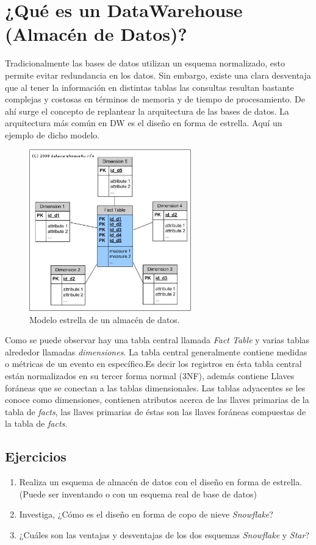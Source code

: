 \section{¿Qué es un DataWarehouse (Almacén de Datos)?}
Tradicionalmente las bases de datos utilizan un esquema normalizado, esto permite evitar redundancia en los datos.
Sin embargo, existe una clara desventaja que al tener la información en distintas tablas las consultas resultan bastante complejas y costosas
en términos de memoria y de tiempo de procesamiento.
De ahí surge el concepto de replantear la arquitectura de las bases de datos.
La arquitectura más común en DW es el diseño en forma de estrella.
Aquí un ejemplo de dicho modelo.
\begin{figure}[h]
\centering
\includegraphics[width=7cm, height=7cm]{star_schema.jpg}
\caption{Modelo estrella de un almacén de datos.}
\label{fig:my_label}
\end{figure}
Como se puede observar hay una tabla central llamada \textit{Fact Table} y varias tablas alrededor llamadas \textit{dimensiones}.
La tabla central generalmente contiene medidas o métricas de un evento en específico.Es decir los registros en ésta tabla central están normalizados en su tercer forma normal (3NF), además contiene Llaves foráneas que se conectan a las tablas dimensionales.
Las tablas adyacentes se les conoce como dimensiones, contienen atributos acerca de las llaves primarias de la tabla de \textit{facts}, las llaves primarias de éstas son las llaves foráneas compuestas de la tabla de \textit{facts}.
\subsection{Ejercicios}
\begin{enumerate}
\item Realiza un esquema de almacén de datos con el diseño en forma de estrella.(Puede ser inventando o con un esquema real de base de datos)
\item Investiga, ¿Cómo es el diseño en forma de copo de nieve \textit{Snowflake}?
\item ¿Cuáles son las ventajas y desventajas de los dos esquemas \textit{Snowflake} y \textit{Star}?
\end{enumerate}
